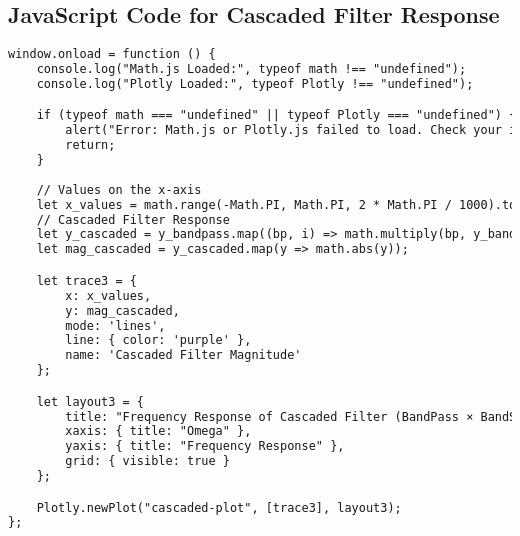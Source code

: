 \documentclass{article}
\begin{document}
\subsection{JavaScript Code for Cascaded Filter Response}
\begin{lstlisting}[language=HTML, caption=Filter Type Definition]
window.onload = function () {
    console.log("Math.js Loaded:", typeof math !== "undefined");
    console.log("Plotly Loaded:", typeof Plotly !== "undefined");

    if (typeof math === "undefined" || typeof Plotly === "undefined") {
        alert("Error: Math.js or Plotly.js failed to load. Check your internet connection.");
        return;
    }
    
    // Values on the x-axis
    let x_values = math.range(-Math.PI, Math.PI, 2 * Math.PI / 1000).toArray();
    // Cascaded Filter Response
    let y_cascaded = y_bandpass.map((bp, i) => math.multiply(bp, y_bandstop[i]));
    let mag_cascaded = y_cascaded.map(y => math.abs(y));

    let trace3 = {
        x: x_values,
        y: mag_cascaded,
        mode: 'lines',
        line: { color: 'purple' },
        name: 'Cascaded Filter Magnitude'
    };

    let layout3 = {
        title: "Frequency Response of Cascaded Filter (BandPass × BandStop)",
        xaxis: { title: "Omega" },
        yaxis: { title: "Frequency Response" },
        grid: { visible: true }
    };

    Plotly.newPlot("cascaded-plot", [trace3], layout3);
};
\end{lstlisting}
\end{document}
